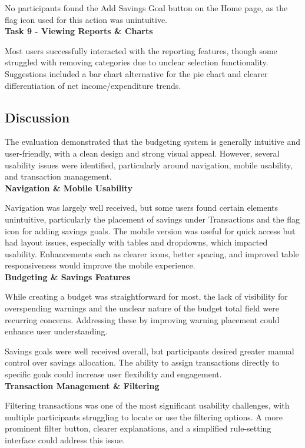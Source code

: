 \documentclass{l4proj}
\begin{document}
No participants found the Add Savings Goal button on the Home page, as the flag icon used for this action was unintuitive.  \\

\textbf{Task 9 - Viewing Reports \& Charts}

Most users successfully interacted with the reporting features, though some struggled with removing categories due to unclear selection functionality. Suggestions included a bar chart alternative for the pie chart and clearer differentiation of net income/expenditure trends.  

\subsection{Discussion}

The evaluation demonstrated that the budgeting system is generally intuitive and user-friendly, with a clean design and strong visual appeal. However, several usability issues were identified, particularly around navigation, mobile usability, and transaction management.  \\

\textbf{Navigation \& Mobile Usability}

Navigation was largely well received, but some users found certain elements unintuitive, particularly the placement of savings under Transactions and the flag icon for adding savings goals. The mobile version was useful for quick access but had layout issues, especially with tables and dropdowns, which impacted usability. Enhancements such as clearer icons, better spacing, and improved table responsiveness would improve the mobile experience.  \\ 

\textbf{Budgeting \& Savings Features}

While creating a budget was straightforward for most, the lack of visibility for overspending warnings and the unclear nature of the budget total field were recurring concerns. Addressing these by improving warning placement could enhance user understanding.  

Savings goals were well received overall, but participants desired greater manual control over savings allocation. The ability to assign transactions directly to specific goals could increase user flexibility and engagement.  \\

\textbf{Transaction Management \& Filtering}

Filtering transactions was one of the most significant usability challenges, with multiple participants struggling to locate or use the filtering options. A more prominent filter button, clearer explanations, and a simplified rule-setting interface could address this issue.  
\end{document}
